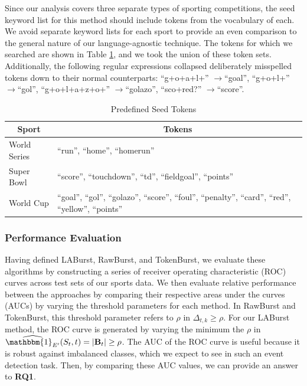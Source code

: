 \documentclass[letterpaper]{article}
\begin{document}
Since our analysis covers three separate types of sporting competitions, the seed keyword list for this method should include tokens from the vocabulary of each. 
We avoid separate keyword lists for each sport to provide an even comparison to the general nature of our language-agnostic technique.
The tokens for which we searched are shown in Table \ref{tab:targetTokens}, and we took the union of these token sets.
Additionally, the following regular expressions collapsed deliberately misspelled tokens down to their normal counterparts: ``g+o+a+l+'' $\rightarrow$``goal'', ``g+o+l+'' $\rightarrow$``gol'', ``g+o+l+a+z+o+'' $\rightarrow$``golazo'', ``sco+red?'' $\rightarrow$``score''.
%
\begin{table}[htdp]
\footnotesize
\caption{Predefined Seed Tokens}
\begin{center}
\begin{tabular}{|p{0.75in}|p{2.0in}|}
\hline
\multicolumn{1}{|c|}{\textbf{Sport}} & \multicolumn{1}{|c|}{\textbf{Tokens}} \\ \hline
World Series & ``run'', ``home'', ``homerun'' \\ \hline
Super Bowl & ``score'', ``touchdown'', ``td'', ``fieldgoal'', ``points'' \\ \hline
World Cup & ``goal'', ``gol'', ``golazo'', ``score'', ``foul'', ``penalty'', ``card'', ``red'', ``yellow'', ``points'' \\ \hline
\end{tabular}
\end{center}
\label{tab:targetTokens}
\end{table}

\subsubsection{Performance Evaluation}

Having defined LABurst, RawBurst, and TokenBurst, we evaluate these algorithms by constructing a series of receiver operating characteristic (ROC) curves across test sets of our sports data.
We then evaluate relative performance between the approaches by comparing their respective areas under the curves (AUCs) by varying the threshold parameters for each method.
In RawBurst and TokenBurst, this threshold parameter refers to $\rho$ in $\Delta_{t, k} \ge \rho$.
For our LABurst method, the ROC curve is generated by varying the minimum the $\rho$ in $\widehat{\mathbbm{1}_{E'}}(S_t, t) = |\mathbf{B}_t| \ge \rho$.
The AUC of the ROC curve is useful because it is robust against imbalanced classes, which we expect to see in such an event detection task.
Then, by comparing these AUC values, we can provide an answer to \textbf{RQ1}.
\end{document}
